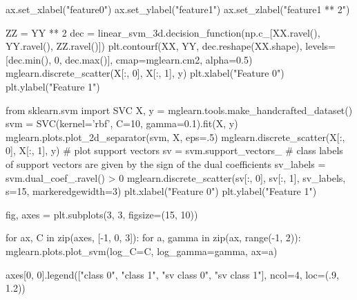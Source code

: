 \documentclass[%
oneside,                 %
final,                   %
10pt]{article}
\begin{document}
ax.set_xlabel("feature0")
ax.set_ylabel("feature1")
ax.set_zlabel("feature1 ** 2")

ZZ = YY ** 2
dec = linear_svm_3d.decision_function(np.c_[XX.ravel(), YY.ravel(), ZZ.ravel()])
plt.contourf(XX, YY, dec.reshape(XX.shape), levels=[dec.min(), 0, dec.max()],
             cmap=mglearn.cm2, alpha=0.5)
mglearn.discrete_scatter(X[:, 0], X[:, 1], y)
plt.xlabel("Feature 0")
plt.ylabel("Feature 1")
\epycod

\bpycod
from sklearn.svm import SVC
X, y = mglearn.tools.make_handcrafted_dataset()                                                                  
svm = SVC(kernel='rbf', C=10, gamma=0.1).fit(X, y)
mglearn.plots.plot_2d_separator(svm, X, eps=.5)
mglearn.discrete_scatter(X[:, 0], X[:, 1], y)
# plot support vectors
sv = svm.support_vectors_
# class labels of support vectors are given by the sign of the dual coefficients
sv_labels = svm.dual_coef_.ravel() > 0
mglearn.discrete_scatter(sv[:, 0], sv[:, 1], sv_labels, s=15, markeredgewidth=3)
plt.xlabel("Feature 0")
plt.ylabel("Feature 1")

fig, axes = plt.subplots(3, 3, figsize=(15, 10))

for ax, C in zip(axes, [-1, 0, 3]):
    for a, gamma in zip(ax, range(-1, 2)):
        mglearn.plots.plot_svm(log_C=C, log_gamma=gamma, ax=a)
        
axes[0, 0].legend(["class 0", "class 1", "sv class 0", "sv class 1"],
                  ncol=4, loc=(.9, 1.2))

\epycod


\end{document}
